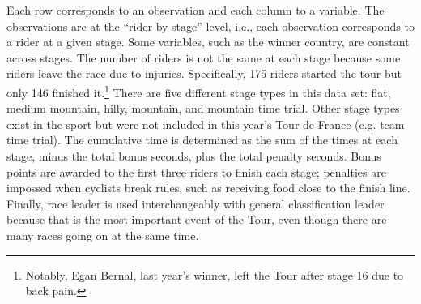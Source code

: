 \documentclass[aos,preprint]{imsart}
\begin{document}
Each row corresponds to an observation and each column to a variable. The observations are at the ``rider by stage'' level, i.e., each observation corresponds to a rider at a given stage. Some variables, such as the winner country, are constant across stages. The number of riders is not the same at each stage because some riders leave the race due to injuries. Specifically, 175 riders started the tour but only 146 finished it.\footnote{Notably, Egan Bernal, last year's winner, left the Tour after stage 16 due to back pain.} There are five different stage types in this data set: flat, medium mountain, hilly, mountain, and mountain time trial. Other stage types exist in the sport but were not included in this year's Tour de France (e.g. team time trial). The cumulative time is determined as the sum of the times at each stage, minus the total bonus seconds, plus the total penalty seconds. Bonus points are awarded to the first three riders to finish each stage; penalties are impossed when cyclists break rules, such as receiving food close to the finish line. Finally, race leader is used interchangeably with general classification leader because that is the most important event of the Tour, even though there are many races going on at the same time.
\end{document}
